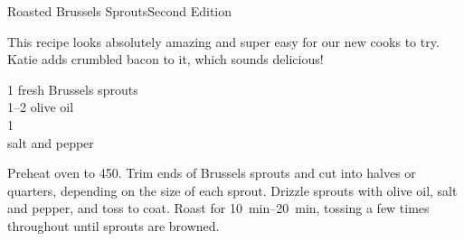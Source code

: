 \begin{entry}{Roasted Brussels Sprouts}{Second Edition}

\begin{open}
 This recipe looks absolutely amazing and super easy for our new cooks to try. Katie adds crumbled bacon to it, which sounds delicious!
\end{open}
\begin{ingredients}
    \SI{1}{\pound} fresh Brussels sprouts \\
    \SIrange{1}{2}{\tblspoon} olive oil\\
    \SI{1}{\tblspoon} \\
    salt and pepper\\
\end{ingredients}
Preheat oven to \SI{450}{\degreeF}. Trim ends of Brussels sprouts and cut into
halves or quarters, depending on the size of each sprout. Drizzle sprouts with
olive oil, salt and pepper, and toss to coat. Roast for
\SIrange{10}{20}{\minute}, tossing a few times throughout until sprouts are
browned.
\end{entry}


